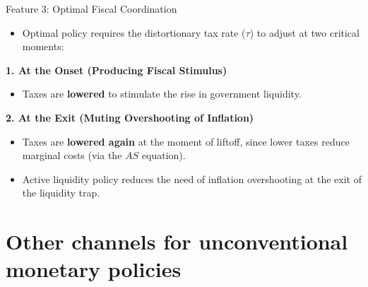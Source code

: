 \documentclass[11pt,aspectratio=169]{beamer}
\begin{document}
\begin{frame}{Feature 3: Optimal Fiscal Coordination}
\small

\begin{itemize}
    \item Optimal policy requires the distortionary tax rate ($\tau$) to adjust at two critical moments:
\end{itemize}

\vspace{0.2cm}

\textbf{1. At the Onset (Producing Fiscal Stimulus)}
\begin{itemize}
    \item Taxes are \textbf{lowered} to stimulate the rise in government liquidity.
\end{itemize}

\vspace{0.2cm}

\textbf{2. At the Exit (Muting Overshooting of Inflation)}
\begin{itemize}
    \item Taxes are \textbf{lowered again} at the moment of liftoff, since lower taxes reduce marginal costs (via the $AS$ equation).
    \item Active liquidity policy reduces the need of inflation overshooting at the exit of the liquidity trap.
\end{itemize}
\end{frame}

\section{Other channels for unconventional monetary policies}
\label{Chapter-UMP-Conclusion}
\end{document}
